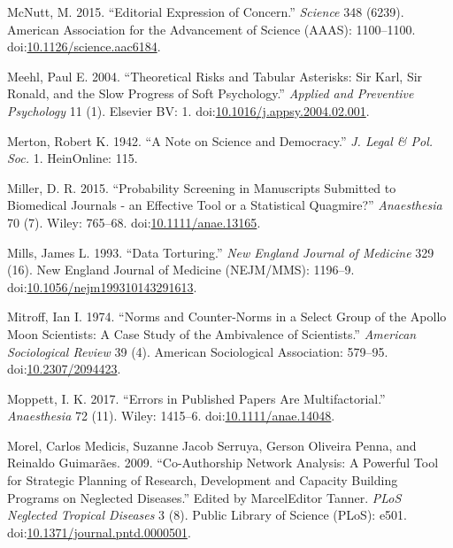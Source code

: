 \documentclass[a5paper]{book}
\begin{document}
\hypertarget{ref-doi:10.1126ux2fscience.aac6184}{}
McNutt, M. 2015. ``Editorial Expression of Concern.'' \emph{Science} 348
(6239). American Association for the Advancement of Science (AAAS):
1100--1100.
doi:\href{https://doi.org/10.1126/science.aac6184}{10.1126/science.aac6184}.

\hypertarget{ref-doi:10.1016ux2fj.appsy.2004.02.001}{}
Meehl, Paul E. 2004. ``Theoretical Risks and Tabular Asterisks: Sir
Karl, Sir Ronald, and the Slow Progress of Soft Psychology.''
\emph{Applied and Preventive Psychology} 11 (1). Elsevier BV: 1.
doi:\href{https://doi.org/10.1016/j.appsy.2004.02.001}{10.1016/j.appsy.2004.02.001}.

\hypertarget{ref-merton1942}{}
Merton, Robert K. 1942. ``A Note on Science and Democracy.'' \emph{J.
Legal \& Pol. Soc.} 1. HeinOnline: 115.

\hypertarget{ref-doi:10.1111ux2fanae.13165}{}
Miller, D. R. 2015. ``Probability Screening in Manuscripts Submitted to
Biomedical Journals - an Effective Tool or a Statistical Quagmire?''
\emph{Anaesthesia} 70 (7). Wiley: 765--68.
doi:\href{https://doi.org/10.1111/anae.13165}{10.1111/anae.13165}.

\hypertarget{ref-doi:10.1056ux2fnejm199310143291613}{}
Mills, James L. 1993. ``Data Torturing.'' \emph{New England Journal of
Medicine} 329 (16). New England Journal of Medicine (NEJM/MMS): 1196--9.
doi:\href{https://doi.org/10.1056/nejm199310143291613}{10.1056/nejm199310143291613}.

\hypertarget{ref-doi:10.2307ux2f2094423}{}
Mitroff, Ian I. 1974. ``Norms and Counter-Norms in a Select Group of the
Apollo Moon Scientists: A Case Study of the Ambivalence of Scientists.''
\emph{American Sociological Review} 39 (4). American Sociological
Association: 579--95.
doi:\href{https://doi.org/10.2307/2094423}{10.2307/2094423}.

\hypertarget{ref-doi:10.1111ux2fanae.14048}{}
Moppett, I. K. 2017. ``Errors in Published Papers Are Multifactorial.''
\emph{Anaesthesia} 72 (11). Wiley: 1415--6.
doi:\href{https://doi.org/10.1111/anae.14048}{10.1111/anae.14048}.

\hypertarget{ref-doi:10.1371ux2fjournal.pntd.0000501}{}
Morel, Carlos Medicis, Suzanne Jacob Serruya, Gerson Oliveira Penna, and
Reinaldo Guimarães. 2009. ``Co-Authorship Network Analysis: A Powerful
Tool for Strategic Planning of Research, Development and Capacity
Building Programs on Neglected Diseases.'' Edited by MarcelEditor
Tanner. \emph{PLoS Neglected Tropical Diseases} 3 (8). Public Library of
Science (PLoS): e501.
doi:\href{https://doi.org/10.1371/journal.pntd.0000501}{10.1371/journal.pntd.0000501}.
\end{document}
